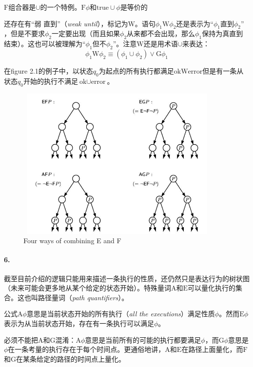 \documentclass{book}
\begin{document}
    $\mathrm{F}$组合器是$\cup$的一个特例。$\mathrm{F}\phi$和$\text{true}\cup\phi$是等价的

    还存在有“弱 直到”（{\itshape weak until}），标记为$\mathrm{W}$。语句$\phi_1\mathrm{W}\phi_2$还是表示为“$\phi_1\text{直到}\phi_2”$，但是不要求$\phi_2$一定要出现（而且如果$\phi_2$从来都不会出现，那么$\phi_1$保持为真直到结束）。这也可以被理解为“$\phi_1$但不$\phi_2$”。注意$\mathrm{W}$还是用术语$\cup$来表达：
    \begin{equation*}
      \phi_1\mathrm{W}\phi_2 \equiv (\phi_1\cup\phi_2) \vee \mathrm{G}\phi_1
    \end{equation*}

    在figure 2.1的例子中，以状态$q_0$为起点的所有执行都满足$\text{ok}\mathrm{W}\text{error}$但是有一条从状态$q_0$开始的执行不满足$\text{ok}\cup\text{error}$。
    \begin{figure}
        \centering
        \includegraphics[width=4.0in,height=3.0in]{2_2.jpg}
        \caption{Four ways of combining E and F}
    \end{figure}

    \paragraph{6.} 截至目前介绍的逻辑只能用来描述一条执行的性质，还仍然只是表达行为的树状图（未来可能会更多地从某个给定的状态开始）。特殊量词$\mathrm{A}$和$\mathrm{E}$可以量化执行的集合。这也叫路径量词（{\itshape path quantifiers}）。

    公式$\mathrm{A}\phi$意思是当前状态开始的所有执行（{\itshape all the executions}）满足性质$\phi$。然而$\mathrm{E}\phi$表示为从当前状态开始，存在有一条执行可以满足$\phi$。

    必须不能把$\mathrm{A}$和$\mathrm{G}$混淆：$\mathrm{A}\phi$意思是当前所有的可能的执行都要满足$\phi$，而$\mathrm{G}\phi$意思是$\phi$在一条考量的执行存在于每个时间点。更通俗地讲，$\mathrm{A}$和$\mathrm{E}$在路径上面量化，而$\mathrm{F}$和$\mathrm{G}$在某条给定的路径的时间点上量化。
\end{document}
